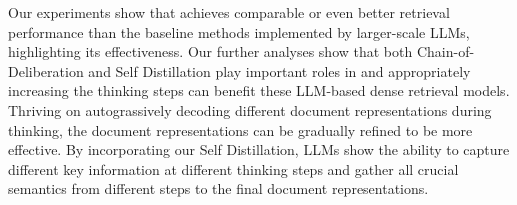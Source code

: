 Our experiments show that \method{} achieves comparable or even better retrieval performance than the baseline methods implemented by larger-scale LLMs, highlighting its effectiveness. Our further analyses show that both Chain-of-Deliberation and Self Distillation play important roles in \method{} and appropriately increasing the thinking steps can benefit these LLM-based dense retrieval models. Thriving on autograssively decoding different document representations during thinking, the document representations can be gradually refined to be more effective. By incorporating our Self Distillation, LLMs show the ability to capture different key information at different thinking steps and gather all crucial semantics from different steps to the final document representations. 

